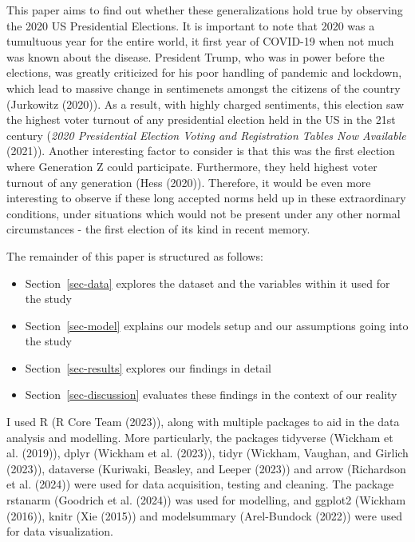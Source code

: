 \documentclass[
  letterpaper,
  DIV=11,
  numbers=noendperiod]{scrartcl}
\begin{document}
This paper aims to find out whether these generalizations hold true by
observing the 2020 US Presidential Elections. It is important to note
that 2020 was a tumultuous year for the entire world, it first year of
COVID-19 when not much was known about the disease. President Trump, who
was in power before the elections, was greatly criticized for his poor
handling of pandemic and lockdown, which lead to massive change in
sentimenets amongst the citizens of the country (Jurkowitz (2020)). As a
result, with highly charged sentiments, this election saw the highest
voter turnout of any presidential election held in the US in the 21st
century (\emph{2020 Presidential Election Voting and Registration Tables
Now Available} (2021)). Another interesting factor to consider is that
this was the first election where Generation Z could participate.
Furthermore, they held highest voter turnout of any generation (Hess
(2020)). Therefore, it would be even more interesting to observe if
these long accepted norms held up in these extraordinary conditions,
under situations which would not be present under any other normal
circumstances - the first election of its kind in recent memory.

The remainder of this paper is structured as follows:

\begin{itemize}
\item
  Section~\ref{sec-data} explores the dataset and the variables within
  it used for the study
\item
  Section~\ref{sec-model} explains our models setup and our assumptions
  going into the study
\item
  Section~\ref{sec-results} explores our findings in detail
\item
  Section~\ref{sec-discussion} evaluates these findings in the context
  of our reality
\end{itemize}

I used R (R Core Team (2023)), along with multiple packages to aid in
the data analysis and modelling. More particularly, the packages
tidyverse (Wickham et al. (2019)), dplyr (Wickham et al. (2023)), tidyr
(Wickham, Vaughan, and Girlich (2023)), dataverse (Kuriwaki, Beasley,
and Leeper (2023)) and arrow (Richardson et al. (2024)) were used for
data acquisition, testing and cleaning. The package rstanarm (Goodrich
et al. (2024)) was used for modelling, and ggplot2 (Wickham (2016)),
knitr (Xie (2015)) and modelsummary (Arel-Bundock (2022)) were used for
data visualization.
\end{document}
